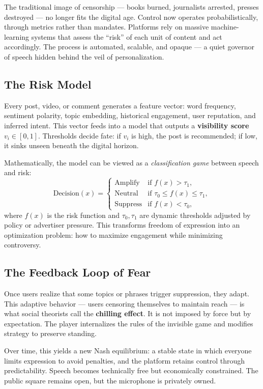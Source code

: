 \documentclass[12pt,twoside]{book}
\begin{document}
The traditional image of censorship --- books burned, journalists arrested, presses destroyed --- no longer fits the digital age.  
Control now operates probabilistically, through metrics rather than mandates.  
Platforms rely on massive machine-learning systems that assess the “risk” of each unit of content and act accordingly.  
The process is automated, scalable, and opaque --- a quiet governor of speech hidden behind the veil of personalization.

\subsection*{The Risk Model}

Every post, video, or comment generates a feature vector: word frequency, sentiment polarity, topic embedding, historical engagement, user reputation, and inferred intent.  
This vector feeds into a model that outputs a \textbf{visibility score} \(v_i \in [0,1]\).  
Thresholds decide fate: if \(v_i\) is high, the post is recommended; if low, it sinks unseen beneath the digital horizon.

Mathematically, the model can be viewed as a \emph{classification game} between speech and risk:  
\[
\text{Decision}(x) = 
\begin{cases}
\text{Amplify} & \text{if } f(x) > \tau_1,\\[4pt]
\text{Neutral} & \text{if } \tau_0 \le f(x) \le \tau_1,\\[4pt]
\text{Suppress} & \text{if } f(x) < \tau_0,
\end{cases}
\]
where \(f(x)\) is the risk function and \(\tau_0, \tau_1\) are dynamic thresholds adjusted by policy or advertiser pressure.  
This transforms freedom of expression into an optimization problem: how to maximize engagement while minimizing controversy.

\subsection*{The Feedback Loop of Fear}

Once users realize that some topics or phrases trigger suppression, they adapt.  
This adaptive behavior --- users censoring themselves to maintain reach --- is what social theorists call the \textbf{chilling effect}.  
It is not imposed by force but by expectation.  
The player internalizes the rules of the invisible game and modifies strategy to preserve standing.

Over time, this yields a new Nash equilibrium: a stable state in which everyone limits expression to avoid penalties, and the platform retains control through predictability.  
Speech becomes technically free but economically constrained.  
The public square remains open, but the microphone is privately owned.
\end{document}
